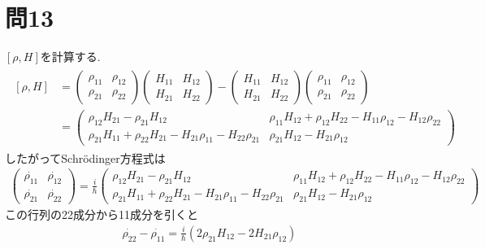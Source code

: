 \documentclass[uplatex,a4j,11pt,dvipdfmx]{jsarticle}
\begin{document}
\section*{問13}
\setcounter{section}{13}
\setcounter{equation}{0}
$[\rho,H]$を計算する.
\begin{align}
  \begin{split}
    [\rho,H]&=
    \begin{pmatrix}
      \rho_{11}&\rho_{12}\\\rho_{21}&\rho_{22}
    \end{pmatrix}
    \begin{pmatrix}
      H_{11}&H_{12}\\H_{21}&H_{22}
    \end{pmatrix}
    -
    \begin{pmatrix}
      H_{11}&H_{12}\\H_{21}&H_{22}
    \end{pmatrix}
    \begin{pmatrix}
      \rho_{11}&\rho_{12}\\\rho_{21}&\rho_{22}
    \end{pmatrix}\\
    &=
    \begin{pmatrix}
      \rho_{12}H_{21}-\rho_{21}H_{12}&\rho_{11}H_{12}+\rho_{12}H_{22}-H_{11}\rho_{12}-H_{12}\rho_{22}\\
      \rho_{21}H_{11}+\rho_{22}H_{21}-H_{21}\rho_{11}-H_{22}\rho_{21}&\rho_{21}H_{12}-H_{21}\rho_{12}
    \end{pmatrix}
  \end{split}
\end{align}
したがってSchr\"{o}dinger方程式は
\begin{align}
  \begin{pmatrix}
    \dot{\rho_{11}}&\dot{\rho_{12}}\\
    \dot{\rho_{21}}&\dot{\rho_{22}}
  \end{pmatrix}
  =\frac{i}{\hbar}
  \begin{pmatrix}
    \rho_{12}H_{21}-\rho_{21}H_{12}&\rho_{11}H_{12}+\rho_{12}H_{22}-H_{11}\rho_{12}-H_{12}\rho_{22}\\
    \rho_{21}H_{11}+\rho_{22}H_{21}-H_{21}\rho_{11}-H_{22}\rho_{21}&\rho_{21}H_{12}-H_{21}\rho_{12}
  \end{pmatrix}
\end{align}
この行列の22成分から11成分を引くと
\begin{align}
  \dot{\rho_{22}}-\dot{\rho_{11}}=\frac{i}{\hbar}(2\rho_{21}H_{12}-2H_{21}\rho_{12})
\end{align}
\end{document}
